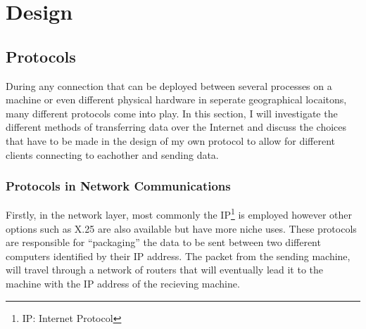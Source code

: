 \chapter{Design}

\section{Protocols}
During any connection that can be deployed between several processes on a machine or even different physical hardware in seperate geographical locaitons, many different protocols come into play. In this section, I will investigate the different methods of transferring data over the Internet and discuss the choices that have to be made in the design of my own protocol to allow for different clients connecting to eachother and sending data.

\subsection{Protocols in Network Communications}
Firstly, in the network layer, most commonly the IP\footnote{IP: Internet Protocol} is employed however other options such as X.25 are also available but have more niche uses. These protocols are responsible for ``packaging'' the data to be sent between two different computers identified by their IP address. The packet from the sending machine, will travel through a network of routers that will eventually lead it to the machine with the IP address of the recieving machine.

